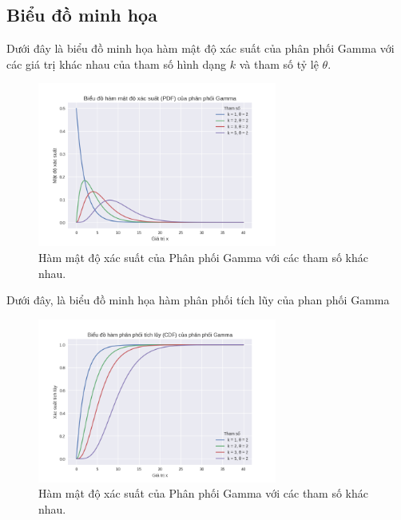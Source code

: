 	\subsection{Biểu đồ minh họa}
	Dưới đây là biểu đồ minh họa hàm mật độ xác suất của phân phối Gamma với các giá trị khác nhau của tham số hình dạng $k$ và tham số tỷ lệ $\theta$.
	
	\begin{figure}[h!]
		\centering
		\includegraphics[width=0.7\textwidth]{images/Gamma Distribution-PDF.png} %
		\caption{Hàm mật độ xác suất của Phân phối Gamma với các tham số khác nhau.}
		\label{fig:Gamma Distribution-PDF}
	\end{figure}
	
	Dưới đây, là biểu đồ minh họa hàm phân phối tích lũy của phan phối Gamma
	
		\begin{figure}[h!]
		\centering
		\includegraphics[width=0.7\textwidth]{images/Gamma Distribution-CDF.png} %
		\caption{Hàm mật độ xác suất của Phân phối Gamma với các tham số khác nhau.}
		\label{fig:Gamma Distribution-CDF}
	\end{figure}
	
